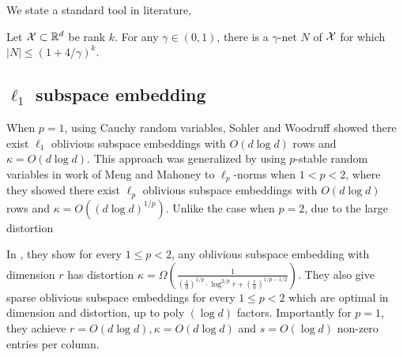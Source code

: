 We state a standard tool in literature,
\begin{lemma}\label{lem:epsilon_net}
Let ${\cal X} \subset\mathbb{R}^d$ be rank $k$. For any $\gamma \in (0,1)$, there is a $\gamma$-net $N$ of ${\cal X}$ for which $|N| \leq (1+4 /\gamma)^k$.
\end{lemma}

\subsection{$\ell_1$ subspace embedding}\label{sec:l1_subspace}

 When $p=1$, using Cauchy random variables, Sohler and Woodruff \cite{sw11} showed there exist $\ell_1$ oblivious subspace embeddings with $O(d \log d)$ rows and $\kappa=O(d \log d)$. This approach was generalized by using $p$-stable random variables in work of Meng and Mahoney \cite{mm13} to $\ell_p$-norms when $1<p<2$, where they showed there exist $\ell_p$ oblivious subspace embeddings with $O(d \log d)$ rows and $\kappa=O ((d \log d)^{1 / p} )$. Unlike the case when $p=2$, due to the large distortion


 In \cite{ww18}, they show for every $1 \leq p<2$, any oblivious subspace embedding with dimension $r$ has distortion $\kappa=\Omega (\frac{1}{ (\frac{1}{d} )^{1 / p} \cdot \log ^{2 / p} r+ (\frac{r}{n} )^{1 / p-1 / 2}} )$. 
 They also give sparse oblivious subspace embeddings for every $1 \leq p<2$ which are optimal in dimension and distortion, up to poly $(\log d)$ factors. Importantly for $p=1$, they achieve $r=O(d \log d), \kappa=O(d \log d)$ and $s=O(\log d)$ non-zero entries per column. 

